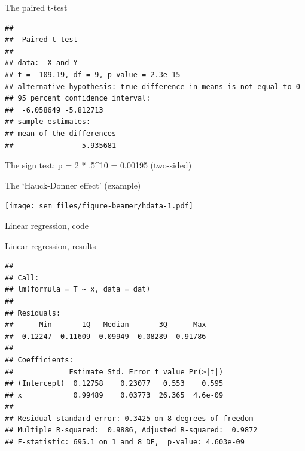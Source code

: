 \begin{frame}[fragile]{The paired t-test}

\scriptsize

\begin{Shaded}
\begin{Highlighting}[]
 \NormalTok{)}
\end{Highlighting}
\end{Shaded}

\begin{verbatim}
## 
##  Paired t-test
## 
## data:  X and Y
## t = -109.19, df = 9, p-value = 2.3e-15
## alternative hypothesis: true difference in means is not equal to 0
## 95 percent confidence interval:
##  -6.058649 -5.812713
## sample estimates:
## mean of the differences 
##               -5.935681
\end{verbatim}

\normalsize

The sign test: p = 2 * .5\^{}10 = 0.00195 (two-sided)

\end{frame}

\begin{frame}{The `Hauck-Donner effect' (example)}

\texttt{[image: sem\_files/figure-beamer/hdata-1.pdf]}

\end{frame}

\begin{frame}[fragile]{Linear regression, code}

\begin{Shaded}
\begin{Highlighting}[]
\NormalTok{(} \NormalTok{)}
\StringTok{ }\StringTok{ } 
\end{Highlighting}
\end{Shaded}

\end{frame}

\begin{frame}[fragile]{Linear regression, results}

\scriptsize

\begin{verbatim}
## 
## Call:
## lm(formula = T ~ x, data = dat)
## 
## Residuals:
##      Min       1Q   Median       3Q      Max 
## -0.12247 -0.11609 -0.09949 -0.08289  0.91786 
## 
## Coefficients:
##             Estimate Std. Error t value Pr(>|t|)
## (Intercept)  0.12758    0.23077   0.553    0.595
## x            0.99489    0.03773  26.365  4.6e-09
## 
## Residual standard error: 0.3425 on 8 degrees of freedom
## Multiple R-squared:  0.9886, Adjusted R-squared:  0.9872 
## F-statistic: 695.1 on 1 and 8 DF,  p-value: 4.603e-09
\end{verbatim}

\end{frame}

